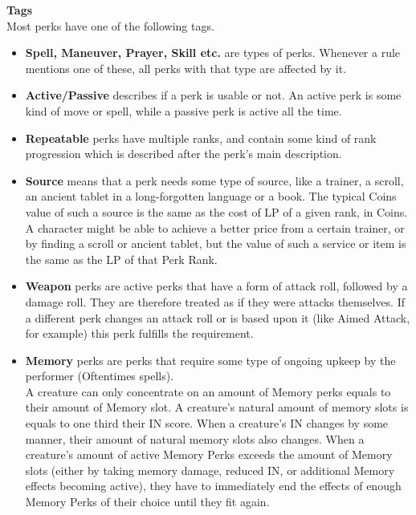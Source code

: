 \textbf{Tags}\\
Most perks have one of the following tags.\\
\begin{itemize}
	\item \textbf{Spell, Maneuver, Prayer, Skill etc.} are types of perks.
	 Whenever a rule mentions one of these, all perks with that type are affected by it.\\
	\item \textbf{Active/Passive} describes if a perk is usable or not.
	An active perk is some kind of move or spell, while a passive perk is active all the time.\\
	\item \textbf{Repeatable} perks have multiple ranks, and contain some kind of rank progression which is described after the perk's main description.\\
	\item \textbf{Source} means that a perk needs some type of source, like a trainer, a scroll, an ancient tablet in a long-forgotten language or a book.
	The typical Coins value of such a source is the same as the cost of LP of a given rank, in Coins.\\
	A character might be able to achieve a better price from a certain trainer, or by finding a scroll or ancient tablet, but the value of such a service or item is the same as the LP of that Perk Rank.\\
	\item \textbf{Weapon} perks are active perks that have a form of attack roll, followed by a damage roll.
	They are therefore treated as if they were attacks themselves.
	If a different perk changes an attack roll or is based upon it (like Aimed Attack, for example) this perk fulfills the requirement.\\
	\item \textbf{Memory} perks are perks that require some type of ongoing upkeep by the performer (Oftentimes spells).\\
	A creature can only concentrate on an amount of Memory perks equals to their amount of Memory slot.
	A creature's natural amount of memory slots is equals to one third their IN score.
	When a creature's IN changes by some manner, their amount of natural memory slots also changes.
	When a creature's amount of active Memory Perks exceeds the amount of Memory slots (either by taking memory damage, reduced IN, or additional Memory effects becoming active), they have to immediately end the effects of enough Memory Perks of their choice until they fit again.
\end{itemize}

